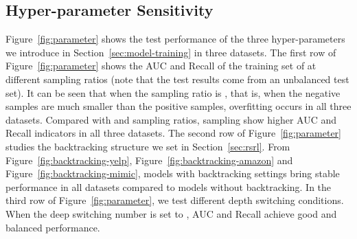 \subsection{Hyper-parameter Sensitivity}\label{sec:hyper-parameter}
Figure~\ref{fig:parameter} shows the test performance of the three hyper-parameters we introduce in Section~\ref{sec:model-training} in three datasets.
The first row of Figure~\ref{fig:parameter} shows the AUC and Recall of the training set of \RioGNN at different sampling ratios (note that the test results come from an unbalanced test set). 
It can be seen that when the sampling ratio is , that is, when the negative samples are much smaller than the positive samples, overfitting occurs in all three datasets. 
Compared with  and  sampling ratios,  sampling show higher AUC and Recall indicators in all three datasets.
The second row of Figure~\ref{fig:parameter} studies the backtracking structure we set in Section~\ref{sec:rsrl}. 
From Figure~\ref{fig:backtracking-yelp}, Figure~\ref{fig:backtracking-amazon} and Figure~\ref{fig:backtracking-mimic}, models with backtracking settings bring stable performance in all datasets compared to models without backtracking.
In the third row of Figure~\ref{fig:parameter}, we test different depth switching conditions. 
When the deep switching number is set to , AUC and Recall achieve good and balanced performance.





